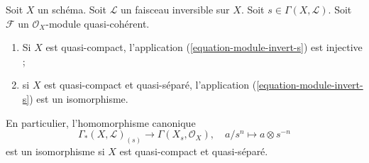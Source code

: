 \begin{lemma}
\label{lemma-invert-s-sections}
\begin{reference}
\cite[Section 6.8]{EGA1-second}
\end{reference}
Soit $X$ un schéma. Soit $\mathcal{L}$ un faisceau inversible sur $X$.
Soit $s \in \Gamma(X, \mathcal{L})$. Soit $\mathcal{F}$ un
$\mathcal{O}_X$-module quasi-cohérent.
\begin{enumerate}
\item Si $X$ est quasi-compact, l'application (\ref{equation-module-invert-s})
est injective ;
\item si $X$ est quasi-compact et quasi-séparé,
l'application (\ref{equation-module-invert-s}) est un isomorphisme.
\end{enumerate}
En particulier, l'homomorphisme canonique
$$
\Gamma_*(X, \mathcal{L})_{(s)}
\longrightarrow
\Gamma(X_s, \mathcal{O}_X),\quad
a/s^n \longmapsto a \otimes s^{-n}
$$
est un isomorphisme si $X$ est quasi-compact et quasi-séparé.
\end{lemma}

